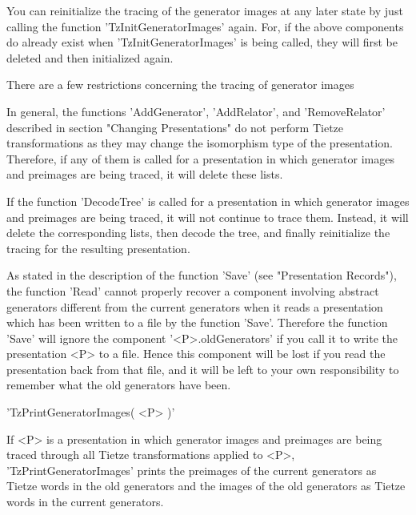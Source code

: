 You can  reinitialize the tracing of  the  generator images at  any later
state by just calling the function 'TzInitGeneratorImages' again. For, if
the   above components do   already exist when 'TzInitGeneratorImages' is
being called, they will first be deleted and then initialized again.

There    are  a few restrictions    concerning  the tracing  of generator
images{\:}

In   general,    the    functions    'AddGenerator',  'AddRelator',   and
'RemoveRelator'  described  in section  "Changing  Presentations"  do not
perform Tietze transformations as they may change the isomorphism type of
the presentation.  Therefore, if any of them is called for a presentation
in which generator images and preimages are  being traced, it will delete
these lists.

If  the function 'DecodeTree'   is called  for   a presentation in  which
generator images and preimages are being traced,  it will not continue to
trace them. Instead, it will delete  the corresponding lists, then decode
the   tree, and  finally  reinitialize   the tracing   for  the resulting
presentation.

As  stated in the description of  the function  'Save' (see "Presentation
Records"), the  function  'Read'  cannot  properly recover   a  component
involving abstract generators different from  the current generators when
it reads a presentation which has been written to a  file by the function
'Save'.   Therefore  the function   'Save'   will  ignore the   component
'<P>.oldGenerators' if  you call it  to write  the  presentation <P> to a
file. Hence this component will be lost if you read the presentation back
from that  file,  and  it  will  be left  to  your own  responsibility to
remember what the old generators have been.

\vspace{5mm}
'TzPrintGeneratorImages( <P> )'%

If <P> is   a presentation in  which  generator images and preimages  are
being  traced  through  all  Tietze  transformations   applied  to <P>,\,
'TzPrintGeneratorImages' prints the preimages  of the current  generators
as  Tietze   words in the   old  generators  and  the  images of  the old
generators as Tietze words in the current generators.


